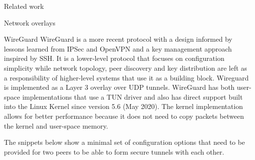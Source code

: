 \begin{frame}[fragile]{Related work}
\begin{block}{Network overlays}
\begin{block}{WireGuard}
\protect\hypertarget{thesis__020-related-work.md__wireguard}{}
WireGuard \autocite{donenfeldWireGuardNextGeneration2017} is a more
recent protocol with a design informed by lessons learned from IPSec and
OpenVPN and a key management approach inspired by SSH. It is a
lower-level protocol that focuses on configuration simplicity while
network topology, peer discovery and key distribution are left as a
responsibility of higher-level systems that use it as a building block.
Wireguard is implemented as a Layer 3 overlay over UDP tunnels.
WireGuard has both user-space implementations that use a TUN driver and
also has direct support built into the Linux Kernel since version 5.6
(May 2020). The kernel implementation allows for better performance
because it does not need to copy packets between the kernel and
user-space memory.

The snippets below show a minimal set of configuration options that need
to be provided for two peers to be able to form secure tunnels with each
other.

\begin{Shaded}
\begin{Highlighting}[]
\KeywordTok{[Interface]}
\OtherTok{=}
\OtherTok{=}\StringTok{ }
\OtherTok{=}

\KeywordTok{[Peer]}
\OtherTok{=}
\OtherTok{=}
\OtherTok{=}
\end{Highlighting}
\end{Shaded}

\begin{Shaded}
\begin{Highlighting}[]
\KeywordTok{[Interface]}
\OtherTok{=}
\OtherTok{=}\StringTok{ }
\OtherTok{=}

\KeywordTok{[Peer]}
\OtherTok{=}
\OtherTok{=}
\end{Highlighting}
\end{Shaded}


\end{block}
\end{block}
\end{frame}
